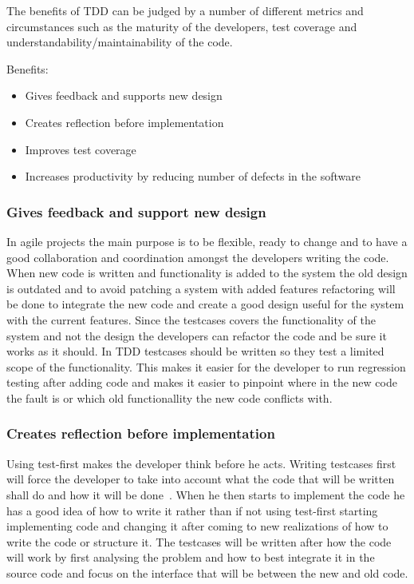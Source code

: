 The benefits of TDD can be judged by a number of different metrics and circumstances such as the maturity of the developers, test coverage and understandability/maintainability of the code.

Benefits:
\begin{itemize}
\item Gives feedback and supports new design
\item Creates reflection before implementation
\item Improves test coverage
\item Increases productivity by reducing number of defects in the software
\end{itemize}

\subsubsection*{Gives feedback and support new design}
In agile projects the main purpose is to be flexible, ready to change and to have a good collaboration and coordination amongst the developers writing the code. When new code is written and functionality is added to the system the old design is outdated and to avoid patching a system with added features refactoring will be done to integrate the new code and create a good design useful for the system with the current features. 
Since the testcases covers the functionality of the system and not the design the developers can refactor the code and be sure it works as it should. 
In TDD testcases should be written so they test a limited scope of the functionality. This makes it easier for the developer to run regression testing after adding code and makes it easier to pinpoint where in the new code the fault is or which old functionallity the new code conflicts with.

\subsubsection*{Creates reflection before implementation}
Using test-first makes the developer think before he acts. Writing testcases first will force the developer to take into account what the code that will be written shall do and how it will be done~\cite{erdogmus}. When he then starts to implement the code he has a good idea of how to write it rather than if not using test-first starting implementing code and changing it after coming to new realizations of how to write the code or structure it. The testcases will be written after how the code will work by first analysing the problem and how to best integrate it in the source code and focus on the interface that will be between the new and old code.

